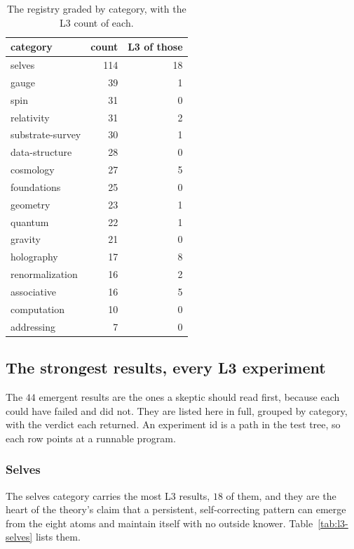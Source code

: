 \begin{table}[ht]
\centering
\begin{tabular}{@{}lrr@{}}
\toprule
category & count & L3 of those \\
\midrule
selves & 114 & 18 \\
gauge & 39 & 1 \\
spin & 31 & 0 \\
relativity & 31 & 2 \\
substrate-survey & 30 & 1 \\
data-structure & 28 & 0 \\
cosmology & 27 & 5 \\
foundations & 25 & 0 \\
geometry & 23 & 1 \\
quantum & 22 & 1 \\
gravity & 21 & 0 \\
holography & 17 & 8 \\
renormalization & 16 & 2 \\
associative & 16 & 5 \\
computation & 10 & 0 \\
addressing & 7 & 0 \\
\bottomrule
\end{tabular}
\caption{The registry graded by category, with the L3 count of each.}
\label{tab:category-registry}
\end{table}

\subsection{The strongest results, every L3 experiment}

The $44$ emergent results are the ones a skeptic should read first, because each could have failed and did not. They are listed here in full, grouped by category, with the verdict each returned. An experiment id is a path in the test tree, so each row points at a runnable program.

\subsubsection{Selves}

The selves category carries the most L3 results, $18$ of them, and they are the heart of the theory's claim that a persistent, self-correcting pattern can emerge from the eight atoms and maintain itself with no outside knower. Table~\ref{tab:l3-selves} lists them.

